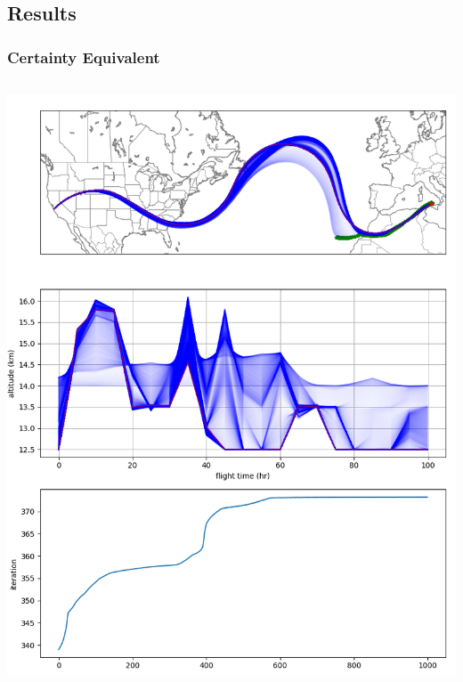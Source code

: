 \documentclass[10pt,mathserif]{beamer}
\begin{document}
\subsection{Results}

\begin{frame}
\frametitle{Certainty Equivalent}
\begin{columns}
\includegraphics[width=1\linewidth,trim={0 9.5cm 0 0cm},clip]{certaintyeq.png}

\end{columns}
\end{frame}
\end{document}
